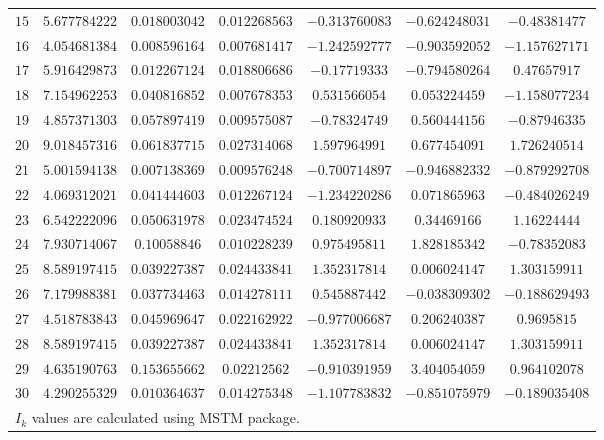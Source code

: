 \documentclass[12pt]{spieman}
\begin{document}
\begin{table}[h]
\begin{center}
\begin{tabular}{|c|c|c|c|c|c|c|}
			$15$ & $5.677784222$ & $0.018003042$ & $0.012268563$ & $-0.313760083$ & $-0.624248031$ & $-0.48381477$ \\
			$16$ & $4.054681384$ & $0.008596164$ & $0.007681417$ & $-1.242592777$ & $-0.903592052$ & $-1.157627171$ \\
			$17$ & $5.916429873$ & $0.012267124$ & $0.018806686$ & $-0.17719333$ & $-0.794580264$ & $0.47657917$ \\
			$18$ & $7.154962253$ & $0.040816852$ & $0.007678353$ & $0.531566054$ & $0.053224459$ & $-1.158077234$ \\
			$19$ & $4.857371303$ & $0.057897419$ & $0.009575087$ & $-0.78324749$ & $0.560444156$ & $-0.87946335$ \\
			$20$ & $9.018457316$ & $0.061837715$ & $0.027314068$ & $1.597964991$ & $0.677454091$ & $1.726240514$ \\
			$21$ & $5.001594138$ & $0.007138369$ & $0.009576248$ & $-0.700714897$ & $-0.946882332$ & $-0.879292708$ \\
			$22$ & $4.069312021$ & $0.041444603$ & $0.012267124$ & $-1.234220286$ & $0.071865963$ & $-0.484026249$ \\
			$23$ & $6.542222096$ & $0.050631978$ & $0.023474524$ & $0.180920933$ & $0.34469166$ & $1.16224444$ \\
			$24$ & $7.930714067$ & $0.10058846$ & $0.010228239$ & $0.975495811$ & $1.828185342$ & $-0.78352083$ \\
			$25$ & $8.589197415$ & $0.039227387$ & $0.024433841$ & $1.352317814$ & $0.006024147$ & $1.303159911$ \\
			$26$ & $7.179988381$ & $0.037734463$ & $0.014278111$ & $0.545887442$ & $-0.038309302$ & $-0.188629493$ \\
			$27$ & $4.518783843$ & $0.045969647$ & $0.022162922$ & $-0.977006687$ & $0.206240387$ & $0.9695815$ \\
			$28$ & $8.589197415$ & $0.039227387$ & $0.024433841$ & $1.352317814$ & $0.006024147$ & $1.303159911$ \\
			$29$ & $4.635190763$ & $0.153655662$ & $0.02212562$ & $-0.910391959$ & $3.404054059$ & $0.964102078$ \\
			$30$ & $4.290255329$ & $0.010364637$ & $0.014275348$ & $-1.107783832$ & $-0.851075979$ & $-0.189035408$ \\
			\hline\hline 
			\multicolumn{7}{l}{\small *$I_k$ values are calculated using MSTM package.} \\
		\end{tabular}
	\end{center}
\end{table}

\end{document}
